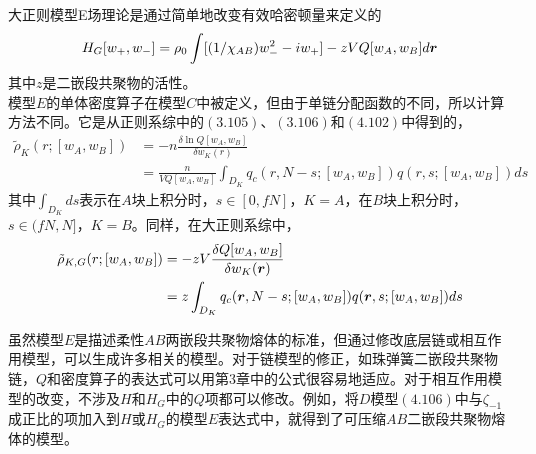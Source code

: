 大正则模型E场理论是通过简单地改变有效哈密顿量来定义的\\
\begin{equation}
H_{G}[ w_{+}, w_{-}]= \rho_{0} \int  [(1/\chi_{AB}) w_{-}^{2}-i w_{+}]- z  V Q[w_{A},w_{B}]d\bm{r}
\end{equation}
其中$z$是二嵌段共聚物的活性。\\

模型$E$的单体密度算子在模型$C$中被定义，但由于单链分配函数的不同，所以计算方法不同。它是从正则系综中的$(3.105)$、$(3.106)$和$(4.102)$中得到的，\\
\begin{equation}
\begin{aligned}
\tilde{\rho}_{K}(r;[w_{A},w_{B}]) &=-n \frac{\delta \ln Q[w_{A},w_{B}]}{\delta w_{K}(r)} \\&= \frac{n}{V Q[w_{A},w_{B}]} \int_{D_{K}} q_{c}(r,N-s;[w_{A},w_{B}])q(r,s;[w_{A},w_{B}])ds
\end{aligned}
\end{equation}
其中$\int_{D_{K}} ds$表示在$A$块上积分时，$s\in[0,fN]$，$K=A$，在$B$块上积分时，$s\in(fN,N]$，$K=B$。同样，在大正则系综中，\\
\begin{equation}
\begin{aligned}
\tilde{\rho}_{K,G}(r;[w_{A},w_{B}])&=-z V \frac{\delta Q[w_{A},w_{B}]}{\delta w_{K}(\bm{r})} \\&= z \int_{D_{K}}  q_{c}(\bm{r},N-s;[w_{A},w_{B}])q(\bm{r},s;[w_{A},w_{B}])d s
\end{aligned}
\end{equation}

虽然模型$E$是描述柔性$AB$两嵌段共聚物熔体的标准，但通过修改底层链或相互作用模型，可以生成许多相关的模型。对于链模型的修正，如珠弹簧二嵌段共聚物链，$Q$和密度算子的表达式可以用第3章中的公式很容易地适应。对于相互作用模型的改变，不涉及$H$和$H_{G}$中的$Q$项都可以修改。例如，将$D$模型$(4.106)$中与$\zeta_{-1}$成正比的项加入到$H$或$H_{G}$的模型$E$表达式中，就得到了可压缩$AB$二嵌段共聚物熔体的模型。

